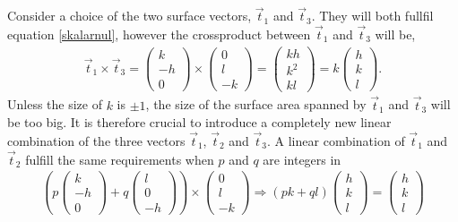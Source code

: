 \documentclass[11pt]{article} %
\begin{document}
Consider a choice of the two surface vectors, $\vec{t}_1$ and $\vec{t}_3$. They will both fullfil equation \ref{skalarnul}, however the crossproduct between $\vec{t}_1$ and $\vec{t}_3$ will be,
\begin{eqnarray}
\vec{t}_1 \times \vec{t}_3 = \left( \begin{array}{c} k \\ - h \\ 0 \end{array} \right) \times \left( \begin{array}{c} 0 \\ l \\ -k \end{array} \right) = \left( \begin{array}{c} kh \\ k^2 \\ kl \end{array} \right) = k \left( \begin{array}{c} h \\  k \\ l \end{array} \right).\nonumber
\end{eqnarray}
Unless the size of $k$ is $\pm 1$, the size of the surface area spanned by $\vec{t}_1$ and $\vec{t}_3$ will be too big. It is therefore crucial to introduce a completely new linear combination of the three vectors $\vec{t}_1$, $\vec{t}_2$ and $\vec{t}_3$. A linear combination of $\vec{t}_1$ and $\vec{t}_2$ fulfill the same requirements when $p$ and $q$ are integers in
\begin{eqnarray}
\left( p \left( \begin{array}{c} k \\ -h \\ 0 \end{array} \right) + q \left( \begin{array}{c} l \\ 0 \\ -h \end{array} \right) \right) \times \left( \begin{array}{c} 0 \\ l \\ -k \end{array} \right) \Rightarrow (pk + ql) \left( \begin{array}{c} h \\ k \\ l \end{array} \right) = \left( \begin{array}{c} h \\ k \\ l \end{array} \right) \label{hkldependency}
\end{eqnarray}
\end{document}

